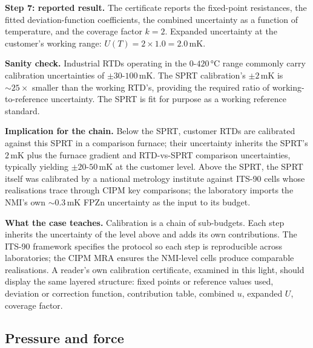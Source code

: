\textbf{Step 7: reported result.} The certificate reports the
fixed-point resistances, the fitted deviation-function coefficients,
the combined uncertainty as a function of temperature, and the
coverage factor $k = 2$. Expanded uncertainty at the customer's
working range:
$U(T) = 2 \times 1.0 = 2.0 \,\si{\milli\kelvin}$.

\textbf{Sanity check.} Industrial RTDs operating in the $0$-$420
\,\si{\degreeCelsius}$ range commonly carry calibration
uncertainties of $\pm 30$-$100 \,\si{\milli\kelvin}$. The SPRT
calibration's $\pm 2 \,\si{\milli\kelvin}$ is $\sim 25\times$
smaller than the working RTD's, providing the required ratio of
working-to-reference uncertainty. The SPRT is fit for purpose as a
working reference standard.

\textbf{Implication for the chain.} Below the SPRT, customer RTDs
are calibrated against this SPRT in a comparison furnace; their
uncertainty inherits the SPRT's $2 \,\si{\milli\kelvin}$ plus the
furnace gradient and RTD-vs-SPRT comparison uncertainties,
typically yielding $\pm 20$-$50 \,\si{\milli\kelvin}$ at the
customer level. Above the SPRT, the SPRT itself was calibrated by
a national metrology institute against ITS-90 cells whose
realisations trace through CIPM key comparisons; the laboratory
imports the NMI's own $\sim 0.3 \,\si{\milli\kelvin}$ FPZn
uncertainty as the input to its budget.

\textbf{What the case teaches.} Calibration is a chain of
sub-budgets. Each step inherits the uncertainty of the level
above and adds its own contributions. The ITS-90 framework
specifies the protocol so each step is reproducible across
laboratories; the CIPM MRA \cite{std:bipm-cipm-mra} ensures the
NMI-level cells produce comparable realisations. A reader's own
calibration certificate, examined in this light, should display
the same layered structure: fixed points or reference values used,
deviation or correction function, contribution table, combined
$u$, expanded $U$, coverage factor.

\subsection{Pressure and force}

